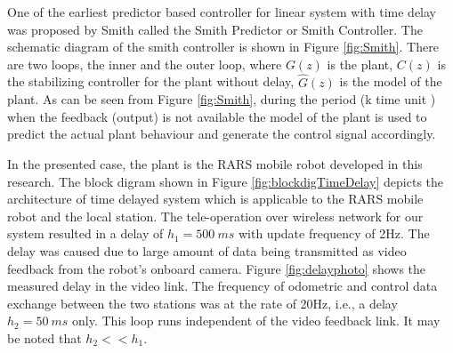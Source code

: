  One of the earliest predictor based controller for linear system with time delay  was proposed by Smith \cite{smith1959controller} called the Smith Predictor or Smith Controller. The schematic diagram of the smith controller is shown in Figure \ref{fig:Smith}. There are two loops, the inner and the outer loop, where $G(z)$ is the plant, $C(z)$ is the stabilizing controller  for the plant without delay, $\hat{G}(z)$ is the model of the plant.  As can be seen from  Figure \ref{fig:Smith}, during the period (k time unit ) when the feedback (output) is not available the model of the plant is used to predict the actual plant behaviour and generate the control signal accordingly. 
 
 In the presented case, the plant is the RARS mobile robot developed in this research. The block digram shown in Figure \ref{fig:blockdigTimeDelay} depicts the architecture of time delayed system which is applicable to the RARS mobile robot and the local station. The tele-operation  over wireless network for our system   resulted in a delay of $h_1= 500~ms$ with update frequency of 2Hz.  The delay was caused due to large amount of data being transmitted as  video feedback from the robot's onboard camera. Figure \ref{fig:delayphoto} shows the measured delay in the video link. The frequency of odometric and control  data exchange between the two stations was at the rate of 20Hz, i.e., a delay $h_2=50~ms$ only. This  loop runs  independent of the video feedback link.  It may be noted that $h_2<<h_1$.
